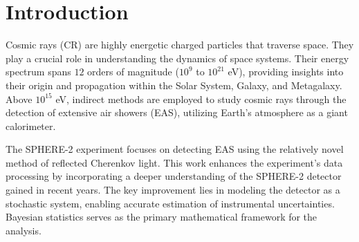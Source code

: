 \chapter*{Introduction}

Cosmic rays (CR) are highly energetic charged particles that traverse space. They play a crucial role in understanding the dynamics of space systems. Their energy spectrum spans $12$ orders of magnitude ($10^9$ to $10^{21}$ eV), providing insights into their origin and propagation within the Solar System, Galaxy, and Metagalaxy. Above $10^{15}$ eV, indirect methods are employed to study cosmic rays through the detection of extensive air showers (EAS), utilizing Earth's atmosphere as a giant calorimeter.

The SPHERE-2 experiment focuses on detecting EAS using the relatively novel method of reflected Cherenkov light. This work enhances the experiment's data processing by incorporating a deeper understanding of the SPHERE-2 detector gained in recent years. The key improvement lies in modeling the detector as a stochastic system, enabling accurate estimation of instrumental uncertainties. Bayesian statistics serves as the primary mathematical framework for the analysis.
